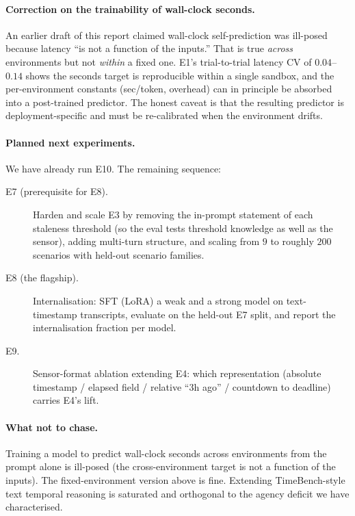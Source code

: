 \documentclass[11pt]{article}
\begin{document}
\paragraph{Correction on the trainability of wall-clock seconds.} An earlier draft of this
report claimed wall-clock self-prediction was ill-posed because latency ``is not a function of
the inputs.'' That is true \emph{across} environments but not \emph{within} a fixed one. E1's
trial-to-trial latency CV of $0.04$--$0.14$ shows the seconds target is reproducible within a
single sandbox, and the per-environment constants (sec/token, overhead) can in principle be
absorbed into a post-trained predictor. The honest caveat is that the resulting predictor is
deployment-specific and must be re-calibrated when the environment drifts.

\paragraph{Planned next experiments.} We have already run E10. The remaining sequence:

\begin{description}
\item[E7 (prerequisite for E8).] Harden and scale E3 by removing the in-prompt statement of
each staleness threshold (so the eval tests threshold knowledge as well as the sensor), adding
multi-turn structure, and scaling from $9$ to roughly $200$ scenarios with held-out scenario
families.
\item[E8 (the flagship).] Internalisation: SFT (LoRA) a weak and a strong model on
text-timestamp transcripts, evaluate on the held-out E7 split, and report the internalisation
fraction per model.
\item[E9.] Sensor-format ablation extending E4: which representation (absolute timestamp /
elapsed field / relative ``$3$h ago'' / countdown to deadline) carries E4's lift.
\end{description}

\paragraph{What not to chase.} Training a model to predict wall-clock seconds across
environments from the prompt alone is ill-posed (the cross-environment target is not a
function of the inputs). The fixed-environment version above is fine. Extending
TimeBench-style text temporal reasoning \citep{chu2024timebench, wang2024tram} is saturated
and orthogonal to the agency deficit we have characterised.
\end{document}
